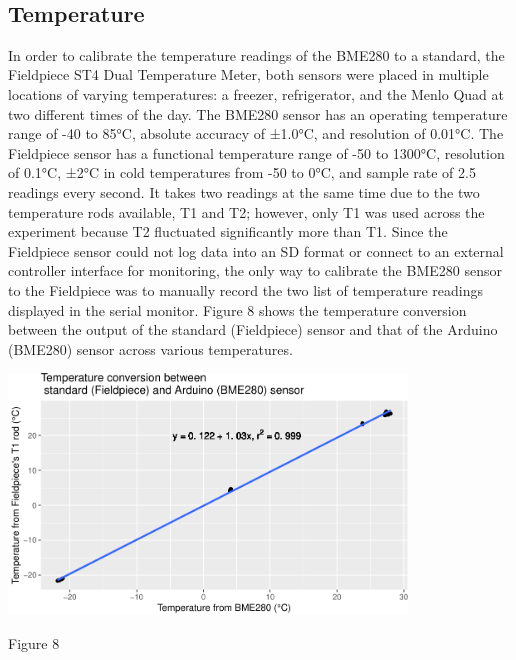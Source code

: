 \documentclass[12pt,]{article}
\begin{document}
~

\subsection{Temperature}\label{temperature}

In order to calibrate the temperature readings of the BME280 to a
standard, the Fieldpiece ST4 Dual Temperature Meter, both sensors were
placed in multiple locations of varying temperatures: a freezer,
refrigerator, and the Menlo Quad at two different times of the day. The
BME280 sensor has an operating temperature range of -40 to 85°C,
absolute accuracy of ±1.0°C, and resolution of 0.01°C. The Fieldpiece
sensor has a functional temperature range of -50 to 1300°C, resolution
of 0.1°C, ±2°C in cold temperatures from -50 to 0°C, and sample rate of
2.5 readings every second. It takes two readings at the same time due to
the two temperature rods available, T1 and T2; however, only T1 was used
across the experiment because T2 fluctuated significantly more than T1.
Since the Fieldpiece sensor could not log data into an SD format or
connect to an external controller interface for monitoring, the only way
to calibrate the BME280 sensor to the Fieldpiece was to manually record
the two list of temperature readings displayed in the serial monitor.
Figure 8 shows the temperature conversion between the output of the
standard (Fieldpiece) sensor and that of the Arduino (BME280) sensor
across various temperatures.

\begin{center}\includegraphics[width=400px]{paper_files/figure-latex/bme_temp-1} \end{center}

Figure 8

~
\end{document}

